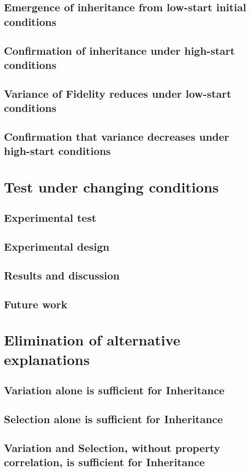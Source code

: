 \documentclass[]{report}
\begin{document}
\section{Emergence of inheritance from low-start initial conditions}
\section{Confirmation of inheritance under high-start conditions}
\section{Variance of Fidelity reduces under low-start conditions}
\section{Confirmation that variance decreases under high-start conditions}

\chapter{Test under changing conditions}
\section{Experimental test}
\section{Experimental design}
\section{Results and discussion}
\section{Future work}

\chapter{Elimination of alternative explanations}
\section{Variation alone is sufficient for Inheritance}
\section{Selection alone is sufficient for Inheritance}
\section{Variation and Selection, without property correlation, is sufficient for Inheritance}
\end{document}
